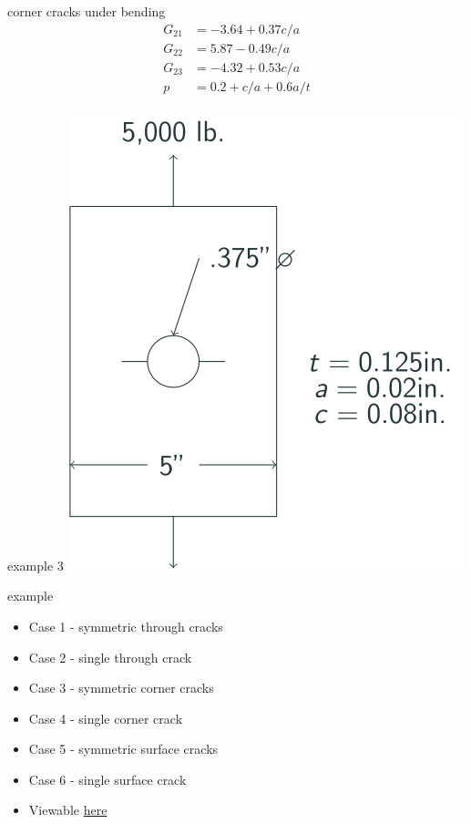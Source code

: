 \documentclass[
  letterpaper,
  ignorenonframetext,
  aspectratio=43,
  handout,
  12pt]{beamer}
\providecommand{\tightlist}{%
  \setlength{\itemsep}{0pt}\setlength{\parskip}{0pt}}
\providecommand{\tightlist}{%
\setlength{\itemsep}{0pt}\setlength{\parskip}{0pt}}
\let\Oldincludegraphics\includegraphics
\renewcommand{\includegraphics}[2][]{\Oldincludegraphics[width=\textwidth,height=0.7\textheight,keepaspectratio]{#2}}
\begin{document}
\begin{frame}{corner cracks under bending}
\protect\hypertarget{corner-cracks-under-bending-6}{}
\[\begin{aligned}
  G_{21} &= -3.64 + 0.37c/a\\
  G_{22} &= 5.87 - 0.49c/a\\
  G_{23} &= -4.32 + 0.53c/a\\
  p &= 0.2 + c/a + 0.6a/t
\end{aligned}\]
\end{frame}

\begin{frame}{example 3}
\protect\hypertarget{example-3}{}
\includegraphics{../images/example 2.svg}
\end{frame}

\begin{frame}{example}
\protect\hypertarget{example}{}
\begin{itemize}
\tightlist
\item
  Case 1 - symmetric through cracks
\item
  Case 2 - single through crack
\item
  Case 3 - symmetric corner cracks
\item
  Case 4 - single corner crack
\item
  Case 5 - symmetric surface cracks
\item
  Case 6 - single surface crack
\item
  Viewable \href{../examples/Cracks\%20Around\%20a\%20Hole.html}{here}
\end{itemize}
\end{frame}
\end{document}
